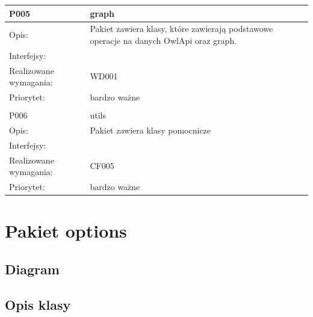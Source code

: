 \documentclass[a4paper,10pt]{article}
\begin{document}
\begin{center}
\begin{longtable}{|m{3cm}|m{9cm}|}
P005 & graph\\ \hline
Opis: & Pakiet zawiera klasy, które zawierają podstawowe operacje na danych OwlApi oraz graph. \\ \hline
Interfejsy: &     \\ \hline
Realizowane wymagania: & WD001 \\ \hline
Priorytet: & bardzo ważne \\ \hline

\multicolumn{2}{c}{} \\
 \hline

P006 & utils\\ \hline
Opis: & Pakiet zawiera klasy pomocnicze \\ \hline
Interfejsy: &     \\ \hline
Realizowane wymagania: & CF005 \\ \hline
Priorytet: & bardzo ważne \\ \hline

\end{longtable}

\end{center}

\section{Pakiet options}

\subsection{Diagram}




\subsection{Opis klasy}
\end{document}
